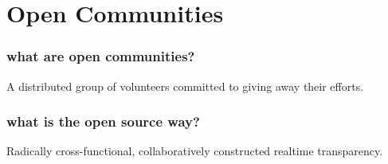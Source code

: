 \section{Open Communities}

\begin{frame} 
\frametitle{what are open communities?}

\huge
\begin{center}
\begin{minipage}{7cm}
A \alert{distributed} group of \alert{volunteers} committed to \alert{giving away} their efforts.
\end{minipage}
\end{center}

\end{frame} 


\begin{frame} 
\frametitle{what is the open source way?}

\huge
\begin{center}
Radically cross-functional,
collaboratively constructed
\alert{realtime transparency}.
\end{center}

\end{frame} 

